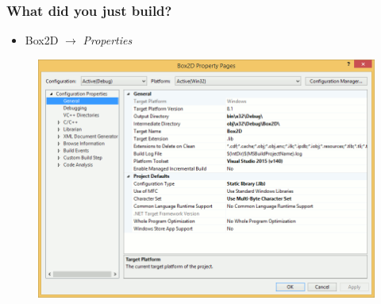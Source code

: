 \documentclass[glossy]{beamer}
\begin{document}

\begin{frame}[fragile=singleslide]
  \frametitle{What did you just build?}

  \begin{itemize}
    \item Box2D $\rightarrow$ \emph{Properties}
  \end{itemize}

  \begin{figure}
    \centering
    \includegraphics[width=0.8\columnwidth]{windows-07}
  \end{figure}
\end{frame}

\end{document}
